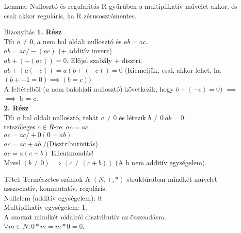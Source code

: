 \documentclass{beamer}
\begin{document}
\begin{frame}

\begin{block}{Lemma: Nullosztó és regularitás}
R gyűrűben a multiplikatív művelet akkor, és csak akkor reguláris, ha R zérusosztómentes.
\end{block}

\begin{block}{Bizonyítás}
\textbf{1. Rész}\\
Tfh $a \neq 0$, a nem bal oldali nullosztó és $ab = ac$.\\
$ab = ac  / -(ac)$ (+ additív inverz)\\
$ab + (-(ac)) = 0$. Előjel szabály + disztri.\\
$ab + (a(-c)) = a(b+(-c)) = 0$ (Kiemeljük, csak akkor lehet, ha $(b + -1 = 0) \implies (b = c)$)\\
A feltételből ($a$ nem baloldali nullosztó) következik, hogy $b + (-c) = 0)$ $\implies$\\
$\implies$ b = c.\\
\bigskip
\textbf{2. Rész}\\
Tfh $a$ bal oldali nullosztó, tehát $a \neq 0$ és létezik $b \neq 0\: ab = 0$.\\
tetszőleges $c \in R$-re: $ac = ac$.\\
$ac = ac / +0 (0 = ab)$\\
$ac = ac + ab$ /(Disztributivitás)\\
$ac = a(c + b)$ Ellentmondás!\\
Mivel $(b \neq 0) \implies (c \neq (c + b))$ (A b nem additív egységelem).

\end{block}

\end{frame}

\begin{frame}

\begin{block}{Tétel: Természetes számok}
A $(N, +, *)$ struktúrában mindkét művelet asszociatív, kommutatív, reguláris.\\
Nullelem (additív egységelem): 0.\\
Multiplikatív egységelem: 1.\\
A szorzat mindkét oldalról disztributív az összeadásra.\\
${\forall}m \in N : 0 * m = m * 0 = 0$.

\end{block}

\end{frame}
\end{document}
